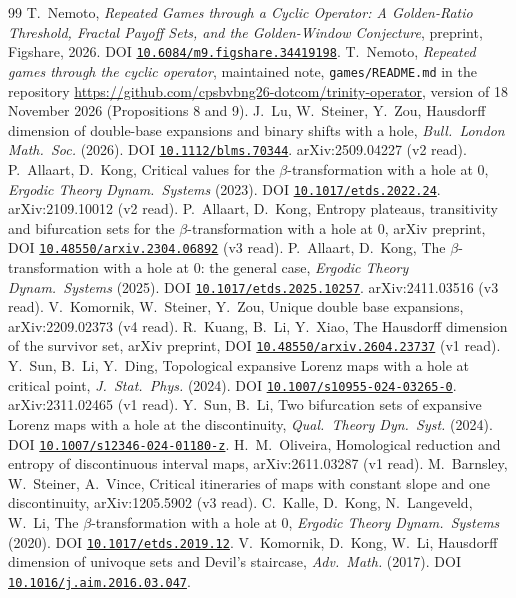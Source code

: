 \documentclass[11pt]{amsart}
\theoremstyle{remark}
\providecommand{\doi}[1]{DOI \href{https://doi.org/#1}{\nolinkurl{#1}}}
\begin{document}
\begin{thebibliography}{99}
 T.~Nemoto, \emph{Repeated Games through a Cyclic Operator: A Golden-Ratio Threshold, Fractal Payoff Sets, and the Golden-Window Conjecture}, preprint, Figshare, 2026. \doi{10.6084/m9.figshare.34419198}.
 T.~Nemoto, \emph{Repeated games through the cyclic operator}, maintained note, \texttt{games/README.md} in the repository \url{https://github.com/cpsbvbng26-dotcom/trinity-operator}, version of 18 November 2026 (Propositions 8 and 9).
 J.~Lu, W.~Steiner, Y.~Zou, Hausdorff dimension of double-base expansions and binary shifts with a hole, \emph{Bull.\ London Math.\ Soc.} (2026). \doi{10.1112/blms.70344}. arXiv:2509.04227 (v2 read).
 P.~Allaart, D.~Kong, Critical values for the $\beta$-transformation with a hole at $0$, \emph{Ergodic Theory Dynam.\ Systems} (2023). \doi{10.1017/etds.2022.24}. arXiv:2109.10012 (v2 read).
 P.~Allaart, D.~Kong, Entropy plateaus, transitivity and bifurcation sets for the $\beta$-transformation with a hole at $0$, arXiv preprint, \doi{10.48550/arxiv.2304.06892} (v3 read).
 P.~Allaart, D.~Kong, The $\beta$-transformation with a hole at $0$: the general case, \emph{Ergodic Theory Dynam.\ Systems} (2025). \doi{10.1017/etds.2025.10257}. arXiv:2411.03516 (v3 read).
 V.~Komornik, W.~Steiner, Y.~Zou, Unique double base expansions, arXiv:2209.02373 (v4 read).
 R.~Kuang, B.~Li, Y.~Xiao, The Hausdorff dimension of the survivor set, arXiv preprint, \doi{10.48550/arxiv.2604.23737} (v1 read).
 Y.~Sun, B.~Li, Y.~Ding, Topological expansive Lorenz maps with a hole at critical point, \emph{J.\ Stat.\ Phys.} (2024). \doi{10.1007/s10955-024-03265-0}. arXiv:2311.02465 (v1 read).
 Y.~Sun, B.~Li, Two bifurcation sets of expansive Lorenz maps with a hole at the discontinuity, \emph{Qual.\ Theory Dyn.\ Syst.} (2024). \doi{10.1007/s12346-024-01180-z}.
 H.~M.~Oliveira, Homological reduction and entropy of discontinuous interval maps, arXiv:2611.03287 (v1 read).
 M.~Barnsley, W.~Steiner, A.~Vince, Critical itineraries of maps with constant slope and one discontinuity, arXiv:1205.5902 (v3 read).
 C.~Kalle, D.~Kong, N.~Langeveld, W.~Li, The $\beta$-transformation with a hole at $0$, \emph{Ergodic Theory Dynam.\ Systems} (2020). \doi{10.1017/etds.2019.12}.
 V.~Komornik, D.~Kong, W.~Li, Hausdorff dimension of univoque sets and Devil's staircase, \emph{Adv.\ Math.} (2017). \doi{10.1016/j.aim.2016.03.047}.

\end{thebibliography}
\end{document}
